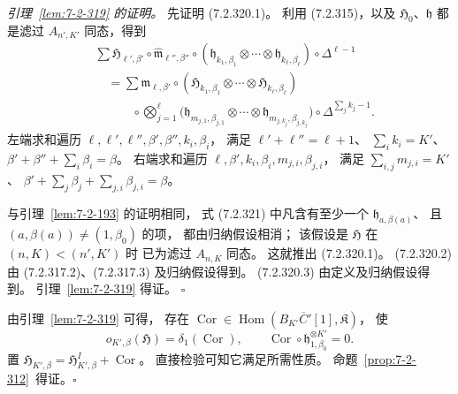 \par\noindent\textit{引理~\ref{lem:7-2-319} 的证明。}
先证明 (7.2.320.1)。
利用 (7.2.315)，以及
$\mathfrak H_0$、$\mathfrak h$
都是滤过 $A_{n',K'}$ 同态，得到
\begin{equation}
\begin{aligned}
&\sum
\mathfrak H_{\ell',\beta'}\circ
\widehat{\mathfrak m}_{\ell'',\beta''}
\circ(\mathfrak h_{k_1,\beta_1}
\otimes\cdots\otimes\mathfrak h_{k_\ell,\beta_\ell})
\circ\Delta^{\ell-1}\\
&\quad=
\sum
\mathfrak m_{\ell,\beta'}\circ
(\mathfrak H_{k_1,\beta_1}
\otimes\cdots\otimes\mathfrak H_{k_\ell,\beta_\ell})\\
&\qquad\quad\circ
\bigotimes_{j=1}^{\ell}
\bigl(\mathfrak h_{m_{j,1},\beta_{j,1}}
\otimes\cdots\otimes
\mathfrak h_{m_{j,k_j},\beta_{j,k_j}}\bigr)
\circ\Delta^{\sum_j k_j-1}.
\end{aligned}
\tag{7.2.321}\label{eq:7-2-321}
\end{equation}
左端求和遍历
$\ell,\ell',\ell'',\beta',\beta'',
k_i,\beta_i$，
满足 $\ell'+\ell''=\ell+1$、
$\sum_i k_i=K'$、
$\beta'+\beta''+\sum_i\beta_i=\beta$。
右端求和遍历
$\ell,\beta',k_i,\beta_i,
m_{j,i},\beta_{j,i}$，
满足
$\sum_{i,j}m_{j,i}=K'$、
$\beta'+\sum_j\beta_j+
\sum_{j,i}\beta_{j,i}=\beta$。

与引理~\ref{lem:7-2-193} 的证明相同，
式 (7.2.321) 中凡含有至少一个
$\mathfrak h_{a,\beta(a)}$、
且 $(a,\beta(a))\ne(1,\beta_0)$
的项，
都由归纳假设相消；
该假设是 $\mathfrak H$
在 $(n,K)<(n',K')$ 时
已为滤过 $A_{n,K}$ 同态。
这就推出 (7.2.320.1)。
(7.2.320.2) 由
(7.2.317.2)、(7.2.317.3)
及归纳假设得到。
(7.2.320.3)
由定义及归纳假设得到。
引理~\ref{lem:7-2-319} 得证。
\hfill$\square$

由引理~\ref{lem:7-2-319} 可得，
存在
$\operatorname{Cor}\in
\operatorname{Hom}
(B_{K'}\overline C'[1],\mathfrak K)$，
使
\begin{equation}
o_{K',\beta}(\mathfrak H)
=\delta_1(\operatorname{Cor}),
\qquad
\operatorname{Cor}\circ
\mathfrak h_{1,\beta_0}^{\otimes K'}=0.
\tag{7.2.322}\label{eq:7-2-322}
\end{equation}
置
$\mathfrak H_{K',\beta}
=\mathfrak H^I_{K',\beta}
+\operatorname{Cor}$。
直接检验可知它满足所需性质。
\mbox{命题~\ref{prop:7-2-312} 得证。\(\square\)}
